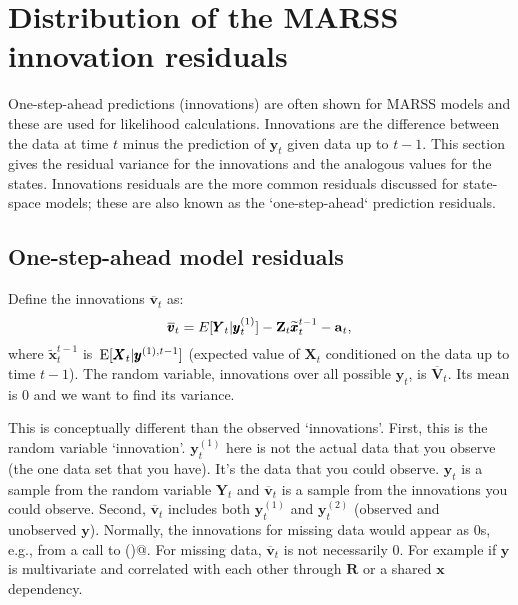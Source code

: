 \documentclass[]{article}
\def\XI{\mbox{\boldmath $\Xi$}}
\def\E{\,\textup{\textrm{E}}}
\def\RR{\mbox{$\mathbf R$}}	 \def\rr{\mbox{$\mathbf r$}} \def\Rb{\mbox{$\mathbf H$}}	\def\Rm{\mathbb{R}}
\def\VV{\mbox{$\pmb{V}$}}	\def\vv{\mbox{$\pmb{v}$}}
\def\XX{\mbox{$\pmb{X}$}}	\def\xx{\mbox{$\pmb{x}$}}
\def\YY{\mbox{$\pmb{Y}$}}	\def\yy{\mbox{$\pmb{y}$}}
\def\ZZ{\mbox{$\mathbf Z$}}	\def\zz{\mbox{$\mathbf z$}}	\def\Zb{\mbox{$\mathbf M$}} \def\Za{\mbox{$\mathbf N$}} \def\Zm{\XI}
\def\hatxttm{\widetilde{\xx}_t^{t-1}}
\def\checkvt{\overline{\vv}_t}
\def\checkVt{\overline{\VV}_t}
\begin{document}
\section{Distribution of the MARSS innovation residuals}

One-step-ahead predictions (innovations) are often shown for MARSS models and these are used for likelihood calculations. Innovations are the difference between the data at time $t$ minus the prediction of $\yy_t$ given data up to $t-1$. This section gives the residual variance for the innovations and the analogous values for the states.   Innovations residuals are the more common residuals discussed for state-space models; these are also known as the `one-step-ahead` prediction residuals. 

\subsection{One-step-ahead model residuals}

Define the innovations $\checkvt$ as:
\begin{equation}\label{eq:vtt1}
\checkvt = E[\YY_t|\yy^{(1)}_t] - \ZZ_t\hatxttm - \aa_t,
\end{equation}
where $\hatxttm$ is $\E[\XX_t|\yy^{(1),t-1}]$ (expected value of $\XX_t$ conditioned on the data up to time $t-1$). The random variable, innovations over all possible $\yy_t$, is $\checkVt$. Its mean is 0 and we want to find its variance. 

This is conceptually different than the observed `innovations'. First, this is the random variable `innovation'.  $\yy^{(1)}_t$ here is not the actual data that you observe (the one data set that you have). It's the data that you could observe. $\yy_t$ is a sample from the random variable $\YY_t$ and $\checkvt$ is a sample from the innovations you could observe. Second, $\checkvt$ includes both $\yy_t^{(1)}$ and $\yy_t^{(2)}$ (observed and unobserved $\yy$). Normally, the innovations for missing data would appear as 0s, e.g., from a call to \verb@MARSSfss()@. For missing data, $\checkvt$ is not necessarily 0. For example if $\yy$ is multivariate and correlated with each other through $\RR$ or a shared $\xx$ dependency.
\end{document}
